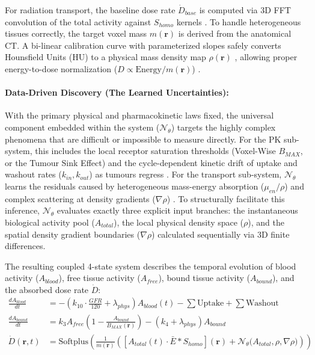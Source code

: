 \documentclass[10pt,letterpaper]{article}
\begin{document}
For radiation transport, the baseline dose rate $\dot{D}_{base}$ is computed via 3D FFT convolution of the total activity against $S_{homo}$ kernels \cite{PistoneAuditore2022}. To handle heterogeneous tissues correctly, the target voxel mass $m(\mathbf{r})$ is derived from the anatomical CT. A bi-linear calibration curve with parameterized slopes safely converts Hounsfield Units (HU) to a physical mass density map $\rho(\mathbf{r})$ \cite{GtzSchmidkonz2019}, allowing proper energy-to-dose normalization ($D \propto \text{Energy} / m(\mathbf{r})$) \cite{StabinMadsen2019, BaileyMarquis2022}.

\paragraph{Data-Driven Discovery (The Learned Uncertainties):}
With the primary physical and pharmacokinetic laws fixed, the universal component embedded within the system ($\mathcal{N}_\theta$) targets the highly complex phenomena that are difficult or impossible to measure directly. For the PK sub-system, this includes the local receptor saturation thresholds (Voxel-Wise $B_{MAX}$, or the Tumour Sink Effect) \cite{BegumThieme2018} and the cycle-dependent kinetic drift of uptake and washout rates ($k_{in}, k_{out}$) as tumours regress \cite{OkamotoThieme2016, SiebingaVeen2024, SiebingaPriv2023}. For the transport sub-system, $\mathcal{N}_\theta$ learns the residuals caused by heterogeneous mass-energy absorption ($\mu_{en}/\rho$) and complex scattering at density gradients ($\nabla \rho$) \cite{MikellKappadath2016, BaileyMarquis2022}. To structurally facilitate this inference, $\mathcal{N}_\theta$ evaluates exactly three explicit input branches: the instantaneous biological activity pool ($A_{total}$), the local physical density space ($\rho$), and the spatial density gradient boundaries ($\nabla \rho$) calculated sequentially via 3D finite differences.

The resulting coupled 4-state system describes the temporal evolution of blood activity ($A_{blood}$), free tissue activity ($A_{free}$), bound tissue activity ($A_{bound}$), and the absorbed dose rate $\dot{D}$:
\begin{align}
    \frac{dA_{blood}}{dt} &= -\left(k_{10} \cdot \frac{GFR}{120} + \lambda_{phys} \right) A_{blood}(t) - \sum \text{Uptake} + \sum \text{Washout} \\
    \frac{dA_{bound}}{dt} &= k_3 A_{free} \left( 1 - \frac{A_{bound}}{B_{MAX}(\mathbf{r})} \right) - (k_4 + \lambda_{phys}) A_{bound} \\
    \dot{D}(\mathbf{r}, t) &= \text{Softplus} \left( \frac{1}{m(\mathbf{r})} \left( \left[ A_{total}(t) \cdot \bar{E} \ast S_{homo} \right](\mathbf{r}) + \mathcal{N}_\theta \Big( A_{total}, \rho, \nabla \rho \Big) \right) \right)
\end{align}
\end{document}

